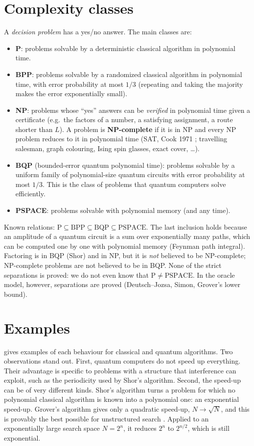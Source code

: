 \section{Complexity classes}
A \emph{decision problem} has a yes/no answer. The main classes are:
\begin{itemize}
  \item \textbf{P}: problems solvable by a deterministic classical algorithm in polynomial time.
  \item \textbf{BPP}: problems solvable by a randomized classical algorithm in polynomial time, with error probability at most $1/3$ (repeating and taking the majority makes the error exponentially small).
  \item \textbf{NP}: problems whose ``yes'' answers can be \emph{verified} in polynomial time given a certificate (e.g.\ the factors of a number, a satisfying assignment, a route shorter than $L$).
  A problem is \textbf{NP-complete} if it is in NP and every NP problem reduces to it in polynomial time (SAT, Cook 1971 \cite{Cook1971}; travelling salesman, graph colouring, Ising spin glasses, exact cover, \dots).
  \item \textbf{BQP} (bounded-error quantum polynomial time): problems solvable by a uniform family of polynomial-size quantum circuits with error probability at most $1/3$. This is the class of problems
  that quantum computers solve efficiently.
  \item \textbf{PSPACE}: problems solvable with polynomial memory (and any time).
\end{itemize}
Known relations: $\mathrm P\subseteq\mathrm{BPP}\subseteq\mathrm{BQP}\subseteq\mathrm{PSPACE}$. The last inclusion holds because an amplitude of a quantum circuit is a sum over exponentially many paths, which can be
computed one by one with polynomial memory (Feynman path integral). Factoring is in BQP (Shor) and in NP, but it is \emph{not} believed to be NP-complete; NP-complete problems are not believed to be in BQP.
None of the strict separations is proved: we do not even know that $\mathrm P\neq\mathrm{PSPACE}$. In the oracle model, however, separations are proved (Deutsch--Jozsa, Simon, Grover's lower bound).

\section{Examples}
 gives examples of each behaviour for classical and quantum algorithms. Two observations stand out. First, quantum computers do not speed up everything. Their advantage is specific to
problems with a structure that interference can exploit, such as the periodicity used by Shor's algorithm. Second, the speed-up can be of very different kinds. Shor's algorithm turns a problem for which no
polynomial classical algorithm is known into a polynomial one: an exponential speed-up. Grover's algorithm gives only a quadratic speed-up, $N\to\sqrt N$, and this is provably the best possible for unstructured
search \cite{BBBV1997}. Applied to an exponentially large search space $N=2^n$, it reduces $2^n$ to $2^{n/2}$, which is still exponential.

